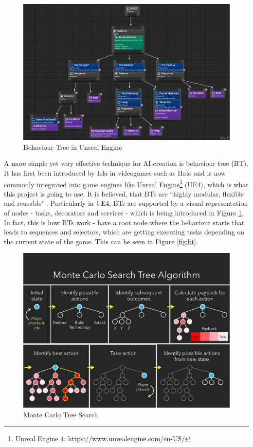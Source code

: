 \documentclass[journal]{IEEEtran}
\begin{document}
\begin{figure}
	\includegraphics[width=\linewidth]{UnrealBehaviourTree.jpg}
	\caption{Behaviour Tree in Unreal Engine}
	\label{fig:ubt}
\end{figure}

A more simple yet very effective technique for AI creation is behaviour tree (BT). It has first been introduced by Isla \cite{gdchalo2} in videogames such as Halo and is now commonly integrated into game engines like Unreal Engine\footnote{\label{engine}Unreal Engine 4: https://www.unrealengine.com/en-US/} (UE4), which is what this project is going to use. It is believed, that BTs are ``highly modular, flexible and reusable" \cite{colledanchise2017behavior}. Particularly in UE4, BTs are supported by a visual representation of nodes - tasks, decorators and services - which is being introduced in Figure \ref{fig:ubt}. In fact, this is how BTs work - have a root node where the behaviour starts that leads to sequences and selectors, which are getting executing tasks depending on the current state of the game. This can be seen in Figure \ref{fig:bt}. %

\begin{figure}
	\includegraphics[width=\linewidth]{MCTS.jpg}
	\caption{Monte Carlo Tree Search \cite{lou2017}}
	\label{fig:mcts}
\end{figure}
\end{document}
